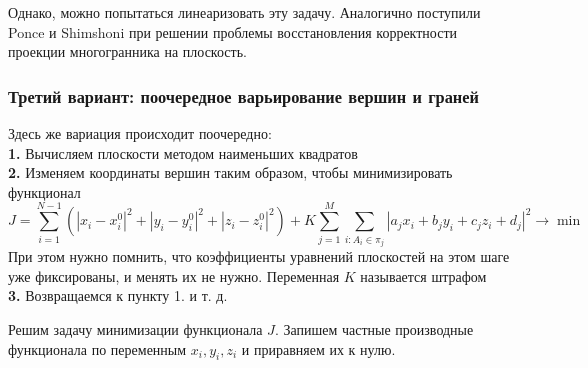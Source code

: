 \documentclass[a4paper,12pt, titlepage]{article}
\begin{document}
\begin{flushleft}
	Однако, можно попытаться линеаризовать эту задачу. Аналогично поступили Ponce и Shimshoni при решении
проблемы восстановления корректности проекции многогранника на плоскость.
\end{flushleft}	



\subsubsection{Третий вариант: поочередное варьирование вершин и граней}
\begin{flushleft}
Здесь же вариация происходит поочередно:\\
	\textbf{1. }Вычисляем плоскости методом наименьших квадратов\\
	\textbf{2. }Изменяем координаты вершин таким образом, чтобы минимизировать функционал\\
$$	
	J = \sum\limits_{i = 1}^{N - 1}(|x_{i} - x_{i}^{0}|^{2} + |y_{i} - y_{i}^{0}|^{2} 
	+ |z_{i} - z_{i}^{0}|^{2}) + 
	K\sum\limits_{j = 1}^{M}\sum\limits_{i: A_{i} \in \pi_{j}}
	|a_{j}x_{i} + b_{j}y_{i} + c_{j}z_{i} + d_{j}|^{2} \to \min		
$$
При этом нужно помнить, что коэффициенты уравнений плоскостей на этом шаге уже фиксированы, и менять
их не нужно. Переменная $K$ называется штрафом\\
	\textbf{3. }Возвращаемся к пункту 1. и т. д.\\
\end{flushleft}

\begin{flushleft}
 Решим задачу минимизации функционала $J$. Запишем частные производные функционала по переменным 
$x_{i}, y_{i}, z_{i}$ и приравняем их к нулю.
\end{flushleft}
\end{document}
